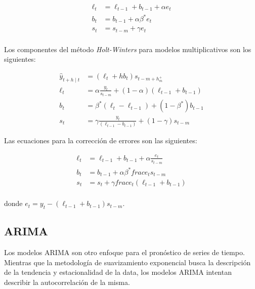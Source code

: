 \begin{equation}
\begin{split}
	\ell_{t} & = \ell_{t-1} + b_{t-1} + \alpha e_{t} \\
    b_{t} & = b_{t-1} + \alpha \beta^{*} e_{t} \\
    s_{t} & = s_{t-m} + \gamma e_{t} \\
\end{split}
\end{equation}

Los componentes del método \emph{Holt-Winters} para modelos multiplicativos son los siguientes:

\begin{equation} 
\begin{split}
	\hat{y}_{t+h \mid t} & = (\ell_{t} + hb_{t}) s_{t-m+h_{m}^{+}} \\
 	\ell_{t} & = \alpha \frac{y_{t}}{s_{t-m}} + (1 - \alpha)(\ell_{t-1} + b_{t-1}) \\
    b_{t} & = \beta^{*}(\ell_{t} - \ell_{t-1}) + (1 - \beta^{*})b_{t-1} \\
    s_{t} & = \gamma \frac{y_{t}}{(\ell_{t-1} - b_{t-1})} + (1-\gamma)s_{t-m}
\end{split}
\end{equation}

Las ecuaciones para la corrección de errores son las siguientes:

\begin{equation}
\begin{split}
	\ell_{t} & = \ell_{t-1} + b_{t-1} + \alpha \frac{e_{t}}{s_{t-m}} \\
    b_{t} & = b_{t-1} + \alpha \beta^{*} frac{e_{t}}{s_{t-m}} \\
    s_{t} & = s_{t} + \gamma frac{e_{t}}{(\ell_{t-1} + b_{t-1})} \\
\end{split}
\end{equation}

donde $e_{t} = y_{t} - (\ell_{t-1} + b_{t-1})s_{t-m}$.

\subsection{ARIMA}
Los modelos ARIMA son otro enfoque para el pronóstico de series de tiempo. Mientras que la metodología de suavizamiento exponencial busca la descripción de la tendencia y estacionalidad de la data, los modelos ARIMA intentan describir la autocorrelación de la misma. 

